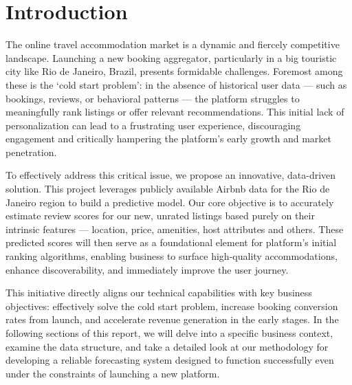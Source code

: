 \section{Introduction}\label{chap:introduction}


The online travel accommodation market is a dynamic and fiercely competitive landscape. Launching a new booking aggregator, particularly in a big touristic city like Rio de Janeiro, Brazil, presents formidable challenges. Foremost among these is the `cold start problem': in the absence of historical user data --- such as bookings, reviews, or behavioral patterns --- the platform struggles to meaningfully rank listings or offer relevant recommendations. This initial lack of personalization can lead to a frustrating user experience, discouraging engagement and critically hampering the platform's early growth and market penetration.

To effectively address this critical issue, we propose an innovative, data-driven solution. This project leverages publicly available Airbnb data for the Rio de Janeiro region to build a predictive model. Our core objective is to accurately estimate review scores for our new, unrated listings based purely on their intrinsic features --- location, price, amenities, host attributes and others. These predicted scores will then serve as a foundational element for platform's initial ranking algorithms, enabling business to surface high-quality accommodations, enhance discoverability, and immediately improve the user journey.

This initiative directly aligns our technical capabilities with key business objectives: effectively solve the cold start problem, increase booking conversion rates from launch, and accelerate revenue generation in the early stages. In the following sections of this report, we will delve into a specific business context, examine the data structure, and take a detailed look at our methodology for developing a reliable forecasting system designed to function successfully even under the constraints of launching a new platform.
